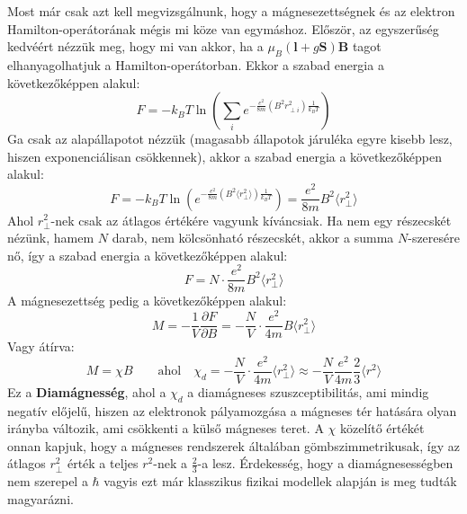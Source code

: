 \documentclass[../main.tex]{subfiles}
\begin{document}
Most már csak azt kell megvizsgálnunk, hogy a mágnesezettségnek és az elektron Hamilton-operátorának mégis mi köze van egymáshoz. Először, az egyszerűség kedvéért nézzük meg, hogy mi van akkor, ha
a $\mu_B \left(\mathbf{l} + g \mathbf{S}\right) \mathbf{B}$ tagot elhanyagolhatjuk a Hamilton-operátorban. Ekkor a szabad energia a következőképpen alakul:
\begin{equation}
    F = - k_B T \ln \left(\sum_i e^{-\frac{e^2}{8m}(B^2 r^2_{\perp i})\frac{1}{k_B T}}\right)
\end{equation}
Ga csak az alapállapotot nézzük (magasabb állapotok járuléka egyre kisebb lesz, hiszen exponenciálisan csökkennek), akkor a szabad energia a következőképpen alakul:
\begin{equation}
    F = - k_B T \ln \left( e^{-\frac{e^2}{8m}(B^2 \langle r^2_\perp \rangle)\frac{1}{k_B T}} \right) = \frac{e^2}{8m} B^2 \langle r^2_\perp \rangle
\end{equation}
Ahol $r^2_\perp$-nek csak az átlagos értékére vagyunk kíváncsiak. Ha nem egy részecskét nézünk, hamem $N$ darab, nem kölcsönható részecskét, akkor a summa $N$-szeresére nő, így a szabad energia a következőképpen alakul:
\begin{equation}
    F = N \cdot \frac{e^2}{8m} B^2 \langle r^2_\perp \rangle
\end{equation}
A mágnesezettség pedig a következőképpen alakul:
\begin{equation}
    M = - \frac{1}{V} \frac{\partial F}{\partial B} = - \frac{N}{V} \cdot \frac{e^2}{4m} B \langle r^2_\perp \rangle
\end{equation}
Vagy átírva:
\begin{equation}
    \boxed{M = \chi B \qquad \text{ahol} \quad \chi_d = - \frac{N}{V} \cdot \frac{e^2}{4m} \langle r^2_\perp \rangle} \approx - \frac{N}{V} \frac{e^2}{4m} \frac{2}{3} \langle r^2 \rangle
\end{equation}
Ez a \textbf{Diamágnesség}, ahol a $\chi_d$ a diamágneses szuszceptibilitás, ami mindig negatív előjelű, hiszen az elektronok pályamozgása a mágneses tér hatására olyan irányba változik,
ami csökkenti a külső mágneses teret. A $\chi$ közelítő értékét onnan kapjuk, hogy a mágneses rendszerek általában gömbszimmetrikusak, így az átlagos $r^2_\perp$ érték a teljes $r^2$-nek a $\frac{2}{3}$-a lesz.
Érdekesség, hogy a diamágnesességben nem szerepel a $\hbar$ vagyis ezt már klasszikus fizikai modellek alapján is meg tudták magyarázni. 
\end{document}
